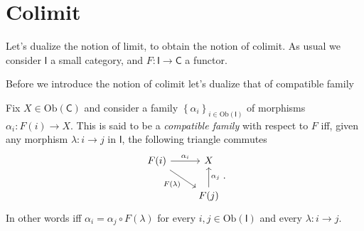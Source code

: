 \section{Colimit}
Let's dualize the notion of limit, to obtain the notion of colimit.
As usual we consider $\mathsf{I}$ a small category, and $F: \mathsf{I} \to \mathsf{C}$ a functor.

Before we introduce the notion of colimit let's dualize that of compatible family
\begin{defn}
	Fix $X \in \mathrm{Ob} \left(\mathsf{C}\right)$ and
	consider a family $\left\{ \alpha_i \right\}_{i \in \mathrm{Ob} \left(\mathsf{I}\right)}$ of morphisms $\alpha_i: F(i) \to X$.
	This is said to be a {\em compatible family} with respect to $F$ iff, given any morphism $\lambda: i \to j$ in $\mathsf{I}$,
	the following triangle commutes
	\begin{equation}
	\begin{tikzcd}
		F(i) \arrow[r, "\alpha_i", rightarrow] \arrow[rd, "F(\lambda)"', rightarrow] &
		X \\
		&
		F(j) \arrow[u, "\alpha_j"', rightarrow] 
	\end{tikzcd}
	.\end{equation} 
	In other words iff $\alpha_i = \alpha_j \circ F(\lambda)$ for every $i, j \in \mathrm{Ob} \left(\mathsf{I}\right)$ and every $\lambda: i \to j$.
\end{defn}

